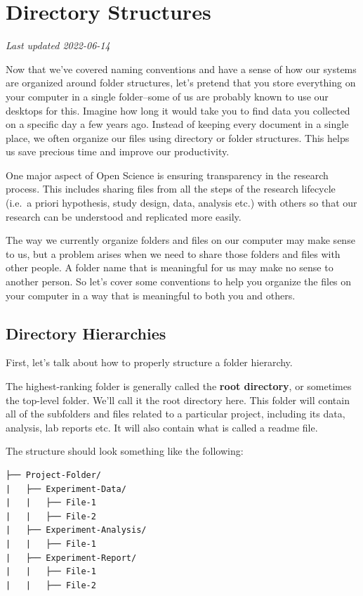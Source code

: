 \documentclass[
]{book}
\begin{document}
\hypertarget{directory-structures}{%
\chapter{Directory Structures}\label{directory-structures}}

\emph{Last updated 2022-06-14}

Now that we've covered naming conventions and have a sense of how our systems are organized around folder structures, let's pretend that you store everything on your computer in a single folder--some of us are probably known to use our desktops for this. Imagine how long it would take you to find data you collected on a specific day a few years ago. Instead of keeping every document in a single place, we often organize our files using directory or folder structures. This helps us save precious time and improve our productivity.

One major aspect of Open Science is ensuring transparency in the research process. This includes sharing files from all the steps of the research lifecycle (i.e.~a priori hypothesis, study design, data, analysis etc.) with others so that our research can be understood and replicated more easily.

The way we currently organize folders and files on our computer may make sense to us, but a problem arises when we need to share those folders and files with other people. A folder name that is meaningful for us may make no sense to another person. So let's cover some conventions to help you organize the files on your computer in a way that is meaningful to both you and others.

\hypertarget{directory-hierarchies}{%
\section{Directory Hierarchies}\label{directory-hierarchies}}

First, let's talk about how to properly structure a folder hierarchy.

The highest-ranking folder is generally called the \textbf{root directory}, or sometimes the top-level folder. We'll call it the root directory here. This folder will contain all of the subfolders and files related to a particular project, including its data, analysis, lab reports etc. It will also contain what is called a readme file.

The structure should look something like the following:

\begin{verbatim}
├── Project-Folder/
|   ├── Experiment-Data/
|   |   ├── File-1
|   |   ├── File-2
|   ├── Experiment-Analysis/
|   |   ├── File-1
|   ├── Experiment-Report/
|   |   ├── File-1
|   |   ├── File-2
\end{verbatim}
\end{document}
